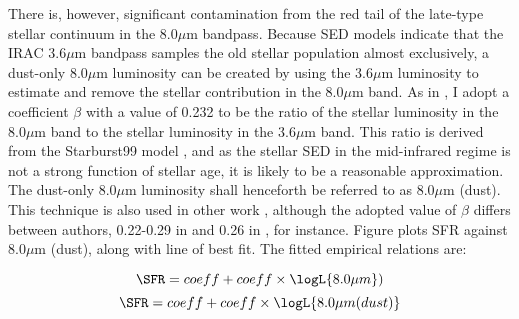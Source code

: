 There is, however, significant contamination from the red tail of the late-type stellar continuum in the 8.0$\mu$m bandpass. Because SED models \citep{LiDraine} indicate that the IRAC 3.6$\mu$m bandpass samples the old stellar population almost exclusively, a dust-only 8.0$\mu$m luminosity can be created by using the 3.6$\mu$m luminosity to estimate and remove the stellar contribution in the 8.0$\mu$m band. As in \cite{Helou}, I adopt a coefficient $\beta$ with a value of 0.232 to be the ratio of the stellar luminosity in the 8.0$\mu$m band to the stellar luminosity in the 3.6$\mu$m band. This ratio is derived from the Starburst99 model \citep{Leitherer}, and as the stellar SED in the mid-infrared regime is not a strong function of stellar age, it is likely to be a reasonable approximation. The dust-only 8.0$\mu$m luminosity shall henceforth be referred to as 8.0$\mu$m (dust). This technique is also used in other work \citep{Calzetti2007,PerezGonzalez,Rosenberg,Wu}, although the adopted value of $\beta$ differs between authors, 0.22-0.29 in \citet{Calzetti2007} and 0.26 in \cite{Wu}, for instance. Figure  plots SFR against 8.0$\mu$m (dust), along with line of best fit. The fitted empirical relations are:


\begin{equation}
\SFR = \fit{sfr_8micron}{ada} + \fit{sfr_8micron}{bdb}\times \logL{8.0\mu m})
\end{equation}
\begin{equation}
\SFR = \fit{sfr_8micron_dust}{ada} + \fit{sfr_8micron_dust}{bdb}\times \logL{8.0\mu m(dust)}
\end{equation}

